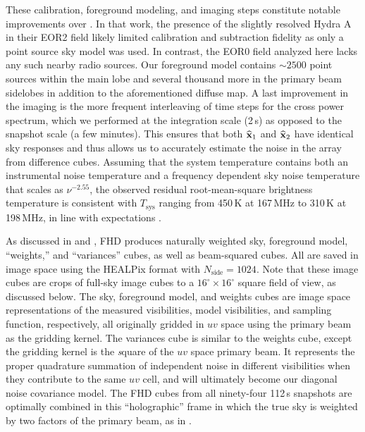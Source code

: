 These calibration, foreground modeling, and imaging steps constitute notable improvements over \cite{X13}. In that work, the presence of the slightly resolved Hydra A in their EOR2 field likely limited calibration and subtraction fidelity as only a point source sky model was used. In contrast, the EOR0 field analyzed here lacks any such nearby radio sources. Our foreground model contains $\sim 2500$ point sources within the main lobe and several thousand more in the primary beam sidelobes in addition to the aforementioned diffuse map. A last improvement in the imaging is the more frequent interleaving of time steps for the cross power spectrum, which we performed at the integration scale (2\,s) as opposed to the snapshot scale (a few minutes). This ensures that both $\widehat{\mathbf{x}}_1$ and $\widehat{\mathbf{x}}_2$ have identical sky responses and thus allows us to accurately estimate the noise in the array from difference cubes. Assuming that the system temperature contains both an instrumental noise temperature and a frequency dependent sky noise temperature that scales as $\nu^{-2.55}$, the observed residual root-mean-square brightness temperature is consistent with $T_\text{sys}$ ranging from 450\,K at 167\,MHz to 310\,K at 198\,MHz, in line with expectations \cite{beardsley13}.

As discussed in \cite{JacobsPipelines} and \cite{HazeltonEppsilon}, FHD produces naturally weighted sky, foreground model, ``weights,'' and ``variances'' cubes, as well as beam-squared cubes. All are saved in image space using the HEALPix format \cite{HEALPIX} with $N_\text{side}=1024$. Note that these image cubes are crops of full-sky image cubes to a $16^\circ\times16^\circ$ square field of view, as discussed below. The sky, foreground model, and weights cubes are image space representations of the measured visibilities, model visibilities, and sampling function, respectively, all originally gridded in $uv$ space using the primary beam as the gridding kernel. The variances cube is similar to the weights cube, except the gridding kernel is the {\textit square} of the $uv$ space primary beam. It represents the proper quadrature summation of independent noise in different visibilities when they contribute to the same $uv$ cell, and will ultimately become our diagonal noise covariance model. The FHD cubes from all ninety-four 112\,s snapshots are optimally combined in this ``holographic'' frame in which the true sky is weighted by two factors of the primary beam, as in \cite{X13}.

